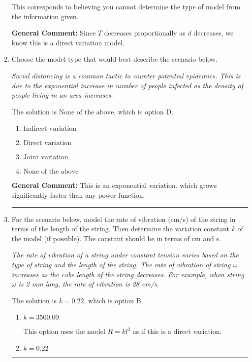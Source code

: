 \documentclass{extbook}[14pt]
\newcommand{\litem}[1]{\item #1

\rule{\textwidth}{0.4pt}}
\begin{document}
\begin{enumerate}
{\begin{enumerate}[label=\Alph*.]
This corresponds to believing you cannot determine the type of model from the information given.
\end{enumerate}

\textbf{General Comment:} Since $T$ decreases proportionally as $d$ decreases, we know this is a direct variation model.
}
\litem{
Choose the model type that would best describe the scenario below.

\begin{center}
    \textit{ Social distancing is a common tactic to counter potential epidemics. This is due to the exponential increase in number of people infected as the density of people living in an area increases. }
\end{center}
The solution is \( \text{None of the above} \), which is option D.\begin{enumerate}[label=\Alph*.]
\item \( \text{Indirect variation} \)


\item \( \text{Direct variation} \)


\item \( \text{Joint variation} \)


\item \( \text{None of the above} \)


\end{enumerate}

\textbf{General Comment:} This is an exponential variation, which grows significantly faster than any power function.
}
\litem{
For the scenario below, model the rate of vibration (cm/s) of the string in terms of the length of the string. Then determine the variation constant $k$ of the model (if possible). The constant should be in terms of cm and s.

\begin{center}
    \textit{ The rate of vibration of a string under constant tension varies based on the type of string and the length of the string. The rate of vibration of string $\omega$ increases as the cube length of the string decreases. For example, when string $\omega$ is 2 mm long, the rate of vibration is 28 cm/s. }
\end{center}
The solution is \( k = 0.22 \), which is option B.\begin{enumerate}[label=\Alph*.]
\item \( k = 3500.00 \)

This option uses the model $R = kl^{3}$ as if this is a direct variation.
\item \( k = 0.22 \)


\end{enumerate}}
\end{enumerate}
\end{document}
